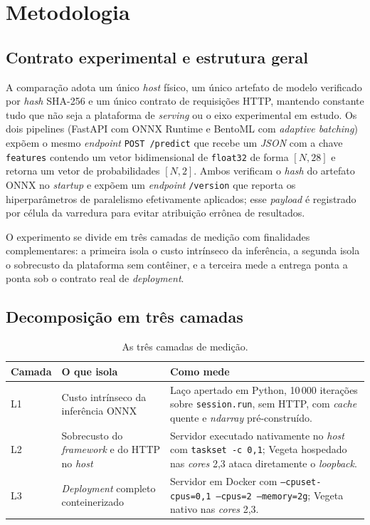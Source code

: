 \section{Metodologia}

\subsection{Contrato experimental e estrutura geral}

A comparação adota um único \textit{host} físico, um único artefato de
modelo verificado por \textit{hash} SHA-256 e um único contrato de
requisições HTTP, mantendo constante tudo que não seja a plataforma de
\textit{serving} ou o eixo experimental em estudo. Os dois pipelines
(FastAPI com ONNX Runtime e BentoML com \textit{adaptive batching})
expõem o mesmo \textit{endpoint} \texttt{POST /predict} que recebe um
\textit{JSON} com a chave \texttt{features} contendo um vetor bidimensional
de \texttt{float32} de forma $[N, 28]$ e retorna um vetor de probabilidades
$[N, 2]$. Ambos verificam o \textit{hash} do artefato ONNX no \textit{startup}
e expõem um \textit{endpoint} \texttt{/version} que reporta os
hiperparâmetros de paralelismo efetivamente aplicados; esse \textit{payload}
é registrado por célula da varredura para evitar atribuição errônea de
resultados.

O experimento se divide em três camadas de medição com finalidades
complementares: a primeira isola o custo intrínseco da inferência, a segunda
isola o sobrecusto da plataforma sem contêiner, e a terceira mede a entrega
ponta a ponta sob o contrato real de \textit{deployment}.

\subsection{Decomposição em três camadas}

\begin{table}[H]
\centering
\caption{As três camadas de medição.}
\label{tab:layers}
\begin{tabularx}{\textwidth}{l X X}
\toprule
Camada & O que isola & Como mede \\
\midrule
L1 & Custo intrínseco da inferência ONNX & Laço apertado em Python, 10\,000 iterações sobre \texttt{session.run}, sem HTTP, com \textit{cache} quente e \textit{ndarray} pré-construído. \\
L2 & Sobrecusto do \textit{framework} e do HTTP no \textit{host} & Servidor executado nativamente no \textit{host} com \texttt{taskset -c 0,1}; Vegeta hospedado nas \textit{cores} 2,3 ataca diretamente o \textit{loopback}. \\
L3 & \textit{Deployment} completo conteinerizado & Servidor em Docker com \texttt{--cpuset-cpus=0,1 --cpus=2 --memory=2g}; Vegeta nativo nas \textit{cores} 2,3. \\
\bottomrule
\end{tabularx}
\end{table}

